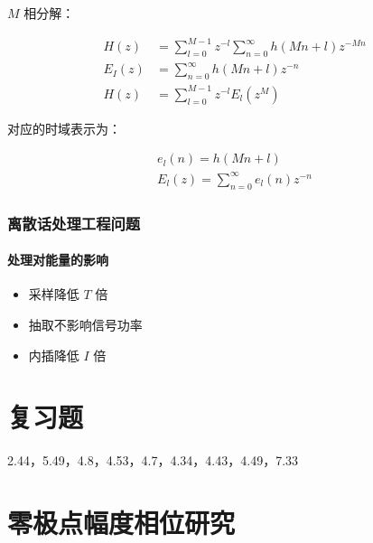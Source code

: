 \documentclass[cn,11pt,chinese,black,simple]{elegantbook}
\begin{document}
\(M\) 相分解：

\[\begin{aligned}
    H(z) &=\sum_{l=0}^{M-1} z^{-l} \sum_{n=0}^{\infty} h(M n+l) z^{-M n} \\
    E_{I}(z) &=\sum_{n=0}^{\infty} h(M n+l) z^{-n} \\
    H(z) &=\sum_{l=0}^{M-1} z^{-l} E_{l}\left(z^{M}\right)
\end{aligned}\]

对应的时域表示为：

\[
\begin{array}{l}
e_{l}(n)=h(M n+l) \\
E_{l}(z)=\sum_{n=0}^{\infty} e_{l}(n) z^{-n}
\end{array}
\]

\subsection{离散话处理工程问题}

\subsubsection{处理对能量的影响}

\begin{itemize}
    \item 采样降低 \(T\) 倍
    \item 抽取不影响信号功率
    \item 内插降低 \(I\) 倍
\end{itemize}

\chapter{复习题}

2.44，5.49，4.8，4.53，4.7，4.34，4.43，4.49，7.33

\appendix

\chapter{零极点幅度相位研究}




\let\chapname\undefined
\ifx\mainclass\undefined
\end{document}
